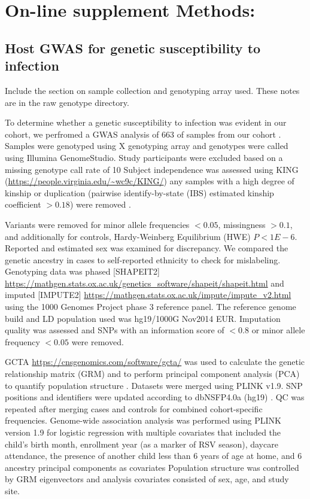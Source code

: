 \documentclass{article}
\begin{document}
\section{On-line supplement Methods:}
\subsection{Host GWAS for genetic susceptibility to infection}

Include the section on sample collection and genotyping array used. 
These notes are in the raw genotype directory. 

To determine whether a genetic susceptibility to infection was evident in our cohort, 
we perfromed a GWAS analysis of 663 of samples from our cohort
\cite{lawless2020genome}.
Samples were genotyped using X genotyping array and genotypes were called using Illumina GenomeStudio. 
Study participants were excluded based on a missing genotype call rate of 10%
Subject independence was assessed using 
 KING (\url{https://people.virginia.edu/~wc9c/KING/})
any samples with a high degree of kinship or duplication 
(pairwise identify-by-state (IBS) estimated kinship coefficient $> 0.18$) were removed 
\cite{manichaikul_robust_2010}. 

Variants were removed for minor allele frequencies $<0.05$, missingness $>0.1$, 
and additionally for controls, Hardy-Weinberg Equilibrium (HWE) $P <1E-6$.
Reported and estimated sex was examined for discrepancy. 
We compared the genetic ancestry in cases to self-reported ethnicity to check for mislabeling. 
Genotyping data was phased 
[SHAPEIT2]
\url{https://mathgen.stats.ox.ac.uk/genetics_software/shapeit/shapeit.html}
and imputed 
[IMPUTE2] 
\url{https://mathgen.stats.ox.ac.uk/impute/impute_v2.html}
using the 1000 Genomes Project phase 3 reference panel. 
The reference genome build and LD population used was hg19/1000G Nov2014 EUR. 
Imputation quality was assessed and SNPs with an information score of $<0.8$ or minor allele frequency $<0.05$ were removed.

GCTA \url{https://cnsgenomics.com/software/gcta/}
was used to calculate the genetic relationship matrix (GRM) and to 
perform principal component analysis (PCA) 
to quantify population structure 
\cite{yang_gcta_2011}. 
Datasets were merged using PLINK v1.9. SNP positions and identifiers were 
updated according to dbNSFP4.0a (hg19) 
\cite{liu_dbnsfp_2016}.
QC was repeated after merging cases and controls for combined cohort-specific 
frequencies. 
Genome-wide association analysis was performed using PLINK version 1.9 for logistic regression with multiple covariates that included the child’s birth month, enrollment year (as a marker of RSV season), daycare attendance, the presence of another child less than 6 years of age at home, and 6 ancestry principal components as covariates
Population structure was controlled by GRM eigenvectors and analysis covariates consisted of sex, age, and study site.
\end{document}

